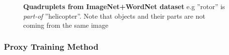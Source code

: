 \begin{figure}[t!]
  \begin{center}

    \caption[Quadruplets from ImageNet+WordNet dataset]{{\bf Quadruplets from ImageNet+WordNet dataset} e.g ''rotor'' is
    \textit{part-of} ''helicopter''. Note that objects and their parts are not
    coming from the same image}

    \label{fig:quad}
    \end{center}
\end{figure}




\subsubsection{Proxy Training Method}


